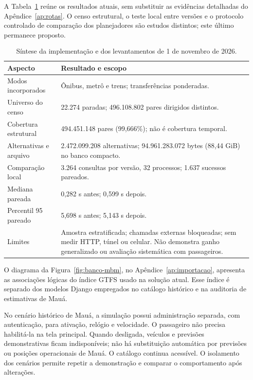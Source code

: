 \documentclass[12pt,oneside,a4paper,brazil,chapter=TITLE]{abntex2}
\begin{document}
A Tabela~\ref{tab:sintese-20261101} reúne os resultados atuais, sem substituir as evidências detalhadas do Apêndice~\ref{ap:rotas}. O censo estrutural, o teste local entre versões e o protocolo controlado de comparação dos planejadores são estudos distintos; este último permanece proposto.
\begin{table}[htbp]
\centering\small
\caption{Síntese da implementação e dos levantamentos de 1 de novembro de 2026.}
\label{tab:sintese-20261101}
\begin{tabular}{p{4.1cm}p{10.4cm}}
\hline
Aspecto & Resultado e escopo\\
\hline
Modos incorporados & Ônibus, metrô e trens; transferências ponderadas.\\
Universo do censo & 22.274 paradas; 496.108.802 pares dirigidos distintos.\\
Cobertura estrutural & 494.451.148 pares (99,666\%); não é cobertura temporal.\\
Alternativas e arquivo & 2.472.099.208 alternativas; 94.961.283.072 bytes (88,44 GiB) no banco compacto.\\
Comparação local & 3.264 consultas por versão, 32 processos; 1.637 sucessos pareados.\\
Mediana pareada & 0,282 s antes; 0,599 s depois.\\
Percentil 95 pareado & 5,698 s antes; 5,143 s depois.\\
Limites & Amostra estratificada; chamadas externas bloqueadas; sem medir HTTP, túnel ou celular. Não demonstra ganho generalizado ou avaliação sistemática com passageiros.\\
\hline
\end{tabular}
\end{table}


O diagrama da Figura~\ref{fig:banco-mbm}, no Apêndice~\ref{ap:importacao}, apresenta as associações lógicas do índice GTFS usado na solução atual. Esse índice é separado dos modelos Django empregados no catálogo histórico e na auditoria de estimativas de Mauá.

No cenário histórico de Mauá, a simulação possui administração separada, com autenticação, para ativação, relógio e velocidade. O passageiro não precisa habilitá-la na tela principal. Quando desligada, veículos e previsões demonstrativas ficam indisponíveis; não há substituição automática por previsões ou posições operacionais de Mauá. O catálogo continua acessível. O isolamento dos cenários permite repetir a demonstração e comparar o comportamento após alterações.
\end{document}
